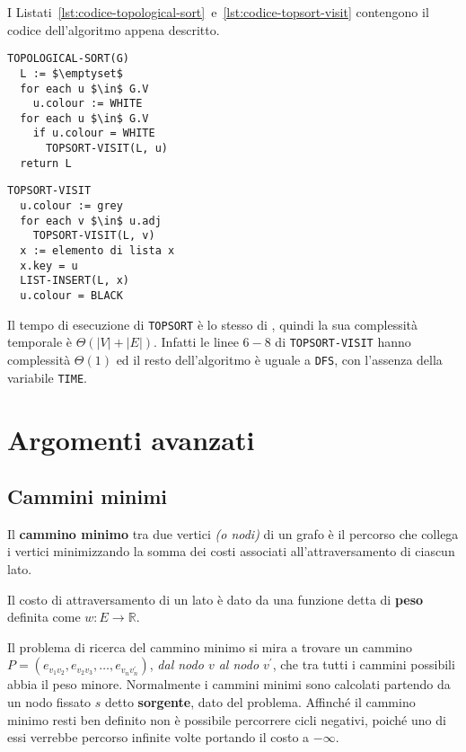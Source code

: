 \documentclass[italian, 10pt]{article}
\begin{document}
\bigskip
I Listati~\ref{lst:codice-topological-sort}~e~\ref{lst:codice-topsort-visit} contengono il codice dell'algoritmo appena descritto.

\begin{minipage}[t]{0.495\textwidth}
  \begin{lstlisting}[style=pseudocode, caption={Algoritmo \texttt{TOPOLOGICAL-SORT}}, label={lst:codice-topological-sort}]
TOPOLOGICAL-SORT(G)
  L := $\emptyset$
  for each u $\in$ G.V
    u.colour := WHITE
  for each u $\in$ G.V
    if u.colour = WHITE
      TOPSORT-VISIT(L, u)
  return L
  \end{lstlisting}
\end{minipage}
\begin{minipage}[t]{0.495\textwidth}
  \begin{lstlisting}[style=pseudocode, caption={Algoritmo \texttt{TOPSORT-VISIT}}, label={lst:codice-topsort-visit}]
TOPSORT-VISIT
  u.colour := grey
  for each v $\in$ u.adj
    TOPSORT-VISIT(L, v)
  x := elemento di lista x
  x.key = u
  LIST-INSERT(L, x)
  u.colour = BLACK
  \end{lstlisting}
\end{minipage}

Il tempo di esecuzione di \texttt{TOPSORT} è lo stesso di \DFS, quindi la sua complessità temporale è \(\Theta(|V|+|E|)\).
Infatti le linee \(6-8\) di \texttt{TOPSORT-VISIT} hanno complessità \(\Theta(1)\) ed il resto dell'algoritmo è uguale a \texttt{DFS}, con l'assenza della variabile \texttt{TIME}.

\clearpage

\section{Argomenti avanzati}

\subsection{Cammini minimi}

Il \textbf{cammino minimo} tra due vertici \textit{(o nodi)} di un grafo è il percorso che collega i vertici minimizzando la somma dei costi associati all'attraversamento di ciascun lato.

Il costo di attraversamento di un lato è dato da una funzione detta di \textbf{peso} definita come \(w: E \rightarrow \mathbb{R}\).

Il problema di ricerca del cammino minimo si mira a trovare un cammino \(P = (e_{v_1 v_2},e_{v_2 v_3},\ldots, e_{v_n v_n^\prime} )\), \textit{dal nodo \(v\) al nodo \(v^\prime\)}, che tra tutti i cammini possibili abbia il peso minore.
Normalmente i cammini minimi sono calcolati partendo da un nodo fissato \(s\) detto \textbf{sorgente}, dato del problema.
Affinché il cammino minimo resti ben definito non è possibile percorrere cicli negativi, poiché uno di essi verrebbe percorso infinite volte portando il costo a \(-\infty\).
\end{document}

